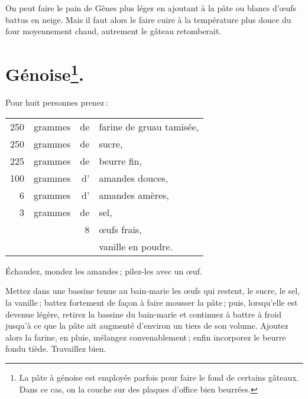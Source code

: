 \sk

On peut faire le pain de Gênes plus léger en ajoutant à la pâte {\mmm} ou
{\mmm} blancs d'œufs battus en neige. Mais il faut alors le faire cuire
à la température plus douce du four moyennement chaud, autrement le gâteau
retomberait.

\section*{\centering Génoise\footnote{La pâte à génoise est employée parfois
pour faire le fond de certains gâteaux. Dans ce cas, on la couche sur des
plaques d'office bien beurrées.}.}
{}

Pour huit personnes prenez :

\footnotesize
\begin{longtable}{rrrp{16em}}
    250 & grammes & de & farine de gruau tamisée,                                                         \\
    250 & grammes & de & sucre,                                                                           \\
    225 & grammes & de & beurre fin,                                                                      \\
    100 & grammes & d' & amandes douces,                                                                  \\
      6 & grammes & d' & amandes amères,                                                                  \\
      3 & grammes & de & sel,                                                                             \\
        &         &  8 & œufs frais,                                                                      \\
        &         &    & vanille en poudre.                                                               \\
\end{longtable}
\normalsize

Échaudez, mondez les amandes ; pilez-les avec un œuf.

Mettez dans une bassine tenue au bain-marie les œufs qui restent, le sucre, le
sel, la vanille ; battez fortement de façon à faire mousser la pâte ; puis,
lorsqu'elle est devenue légère, retirez la bassine du bain-marie et continuez
à battre à froid jusqu'à ce que la pâte ait augmenté d'environ un tiers de son
volume. Ajoutez alors la farine, en pluie, mélangez convenablement ; enfin
incorporez le beurre fondu tiède. Travaillez bien.

